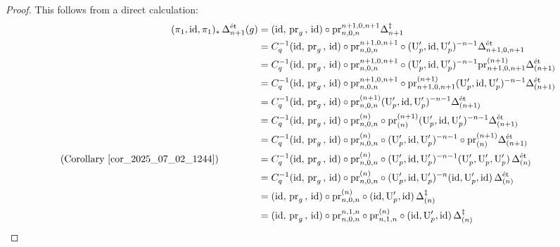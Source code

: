 \documentclass{amsart}
\numberwithin{equation}{section}
\newcommand{\etale}{\textup{\'et}}
\begin{document}
\begin{proof}
    This follows from a direct calculation:
    \begin{align}
     \notag    (\pi_1, {\rm id},\pi_1)_*\,\Delta_{n+1}^{\etale}(g)&= ({\rm id},\,{\rm pr}_g\,,\,{\rm id})\circ {\rm pr}^{n+1,0,n+1}_{n,0,n} \Delta_{n+1}^{\ddagger}\\
 \notag  &= C_q^{-1}({\rm id},\,{\rm pr}_g\,,\,{\rm id})\circ {\rm pr}^{n+1,0,n+1}_{n,0,n}\circ  (\mathrm{U}_{p}',{\rm id},\mathrm{U}_{p}')^{-n-1} \Delta_{n+1,0,n+1}^{\etale}\\
         \notag  &= C_q^{-1}({\rm id},\,{\rm pr}_g\,,\,{\rm id})\circ {\rm pr}^{n+1,0,n+1}_{n,0,n}\circ  (\mathrm{U}_{p}',{\rm id},\mathrm{U}_{p}')^{-n-1} {\rm pr}^{(n+1)}_{n+1,0,n+1}\Delta_{(n+1)}^{\etale}\\
         \label{eqn_2025_07_02_1501}  &= C_q^{-1}({\rm id},\,{\rm pr}_g\,,\,{\rm id})\circ {\rm pr}^{n+1,0,n+1}_{n,0,n}\circ {\rm pr}^{(n+1)}_{n+1,0,n+1} (\mathrm{U}_{p}',{\rm id},\mathrm{U}_{p}')^{-n-1}\Delta_{(n+1)}^{\etale}\\
            \notag &= C_q^{-1}({\rm id},\,{\rm pr}_g\,,\,{\rm id})\circ {\rm pr}^{(n+1)}_{n,0,n} (\mathrm{U}_{p}',{\rm id},\mathrm{U}_{p}')^{-n-1}\Delta_{(n+1)}^{\etale}\\
          \notag &= C_q^{-1}({\rm id},\,{\rm pr}_g\,,\,{\rm id})\circ {\rm pr}^{(n)}_{n,0,n}\circ {\rm pr}^{(n+1)}_{(n)} (\mathrm{U}_{p}',{\rm id},\mathrm{U}_{p}')^{-n-1}\Delta_{(n+1)}^{\etale}\\
           \label{eqn_2025_07_02_1502}   &= C_q^{-1}({\rm id},\,{\rm pr}_g\,,\,{\rm id})\circ {\rm pr}^{(n)}_{n,0,n} \circ (\mathrm{U}_{p}',{\rm id},\mathrm{U}_{p}')^{-n-1}\circ {\rm pr}^{(n+1)}_{(n)}\Delta_{(n+1)}^{\etale}\\
       \notag \hbox{(Corollary~\ref{cor_2025_07_02_1244})}\quad\quad\qquad   \notag    &= C_q^{-1}({\rm id},\,{\rm pr}_g\,,\,{\rm id})\circ {\rm pr}^{(n)}_{n,0,n} \circ (\mathrm{U}_{p}',{\rm id},\mathrm{U}_{p}')^{-n-1}(\mathrm{U}_{p}',\mathrm{U}_{p}',\mathrm{U}_{p}') \,\Delta_{(n)}^{\etale}\\
       \notag      &= C_q^{-1}({\rm id},\,{\rm pr}_g\,,\,{\rm id})\circ {\rm pr}^{(n)}_{n,0,n} \circ (\mathrm{U}_{p}',{\rm id},\mathrm{U}_{p}')^{-n}({\rm id},\mathrm{U}_{p}',{\rm id}) \,\Delta_{(n)}^{\etale}\\
        \notag     &= ({\rm id},\,{\rm pr}_g\,,\,{\rm id})\circ {\rm pr}^{(n)}_{n,0,n} \circ ({\rm id},\mathrm{U}_{p}',{\rm id}) \,\Delta_{(n)}^{\ddagger}\\
       \notag      &= ({\rm id},\,{\rm pr}_g\,,\,{\rm id})\circ {\rm pr}^{n,1,n}_{n,0,n} \circ {\rm pr}^{(n)}_{n,1,n} \circ ({\rm id},\mathrm{U}_{p}',{\rm id}) \,\Delta_{(n)}^{\ddagger}\\

\end{align}
\end{proof}
\end{document}
